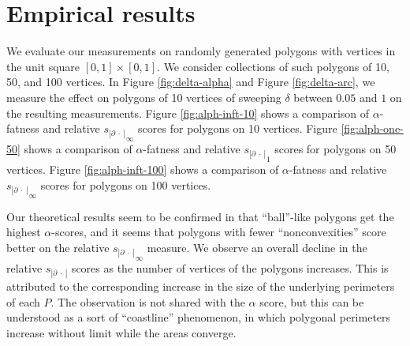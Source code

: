 \documentclass[]{jocg}
\newcommand{\abs}[1]{|#1|}
\newcommand{\chordarc}{{s_{\abs{\partial~\cdot~}}}}
\theoremstyle{definition}
\theoremstyle{remark}
\begin{document}
\section{Empirical results}

We evaluate our measurements on randomly generated polygons with vertices in the
unit square $[0,1] \times [0,1]$. We consider collections of such polygons of
10, 50, and 100 vertices. In Figure \ref{fig:delta-alpha} and Figure
\ref{fig:delta-arc}, we measure the effect on
polygons of 10 vertices of sweeping $\delta$ between $0.05$ and $1$ on the
resulting measurements. Figure \ref{fig:alph-inft-10} shows a comparison of
$\alpha$-fatness and relative ${\chordarc}_{\infty}$ scores for polygons on 10
vertices.  Figure \ref{fig:alph-one-50} shows a comparison of $\alpha$-fatness
and relative ${\chordarc}_1$ scores for polygons on 50 vertices. Figure
\ref{fig:alph-inft-100} shows a comparison of $\alpha$-fatness and relative
${\chordarc}_{\infty}$ scores for polygons on 100 vertices.

Our theoretical results seem to be confirmed in that ``ball''-like polygons get
the highest $\alpha$-scores, and it seems that polygons with fewer
``nonconvexities'' score better on the relative ${\chordarc}_{\infty}$ measure. We
observe an overall decline in the relative $\chordarc$ scores as the number of
vertices of the polygons increases. This is attributed to the corresponding
increase in the size of the underlying perimeters of each $P$. The observation
is not shared with the $\alpha$ score, but this can be understood as a sort of
``coastline'' phenomenon, in which polygonal perimeters increase without limit
while the areas converge.
\end{document}
